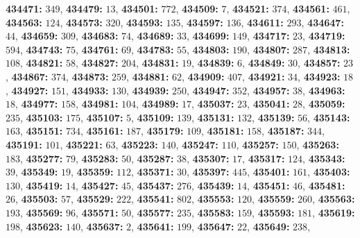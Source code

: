 \textsf{\bfseries 434471:} $349$, \textsf{\bfseries 434479:} $13$, \textsf{\bfseries 434501:} $772$, \textsf{\bfseries 434509:} $7$, \textsf{\bfseries 434521:} $374$, \textsf{\bfseries 434561:} $461$, \textsf{\bfseries 434563:} $124$, \textsf{\bfseries 434573:} $320$, \textsf{\bfseries 434593:} $135$, \textsf{\bfseries 434597:} $136$, \textsf{\bfseries 434611:} $293$, \textsf{\bfseries 434647:} $44$, \textsf{\bfseries 434659:} $309$, \textsf{\bfseries 434683:} $74$, \textsf{\bfseries 434689:} $33$, \textsf{\bfseries 434699:} $149$, \textsf{\bfseries 434717:} $23$, \textsf{\bfseries 434719:} $594$, \textsf{\bfseries 434743:} $75$, \textsf{\bfseries 434761:} $69$, \textsf{\bfseries 434783:} $55$, \textsf{\bfseries 434803:} $190$, \textsf{\bfseries 434807:} $287$, \textsf{\bfseries 434813:} $108$, \textsf{\bfseries 434821:} $58$, \textsf{\bfseries 434827:} $204$, \textsf{\bfseries 434831:} $19$, \textsf{\bfseries 434839:} $6$, \textsf{\bfseries 434849:} $30$, \textsf{\bfseries 434857:} $23$, \textsf{\bfseries 434867:} $374$, \textsf{\bfseries 434873:} $259$, \textsf{\bfseries 434881:} $62$, \textsf{\bfseries 434909:} $407$, \textsf{\bfseries 434921:} $34$, \textsf{\bfseries 434923:} $18$, \textsf{\bfseries 434927:} $151$, \textsf{\bfseries 434933:} $130$, \textsf{\bfseries 434939:} $250$, \textsf{\bfseries 434947:} $352$, \textsf{\bfseries 434957:} $38$, \textsf{\bfseries 434963:} $18$, \textsf{\bfseries 434977:} $158$, \textsf{\bfseries 434981:} $104$, \textsf{\bfseries 434989:} $17$, \textsf{\bfseries 435037:} $23$, \textsf{\bfseries 435041:} $28$, \textsf{\bfseries 435059:} $235$, \textsf{\bfseries 435103:} $175$, \textsf{\bfseries 435107:} $5$, \textsf{\bfseries 435109:} $139$, \textsf{\bfseries 435131:} $132$, \textsf{\bfseries 435139:} $56$, \textsf{\bfseries 435143:} $163$, \textsf{\bfseries 435151:} $734$, \textsf{\bfseries 435161:} $187$, \textsf{\bfseries 435179:} $109$, \textsf{\bfseries 435181:} $158$, \textsf{\bfseries 435187:} $344$, \textsf{\bfseries 435191:} $101$, \textsf{\bfseries 435221:} $63$, \textsf{\bfseries 435223:} $140$, \textsf{\bfseries 435247:} $110$, \textsf{\bfseries 435257:} $150$, \textsf{\bfseries 435263:} $183$, \textsf{\bfseries 435277:} $79$, \textsf{\bfseries 435283:} $50$, \textsf{\bfseries 435287:} $38$, \textsf{\bfseries 435307:} $17$, \textsf{\bfseries 435317:} $124$, \textsf{\bfseries 435343:} $39$, \textsf{\bfseries 435349:} $19$, \textsf{\bfseries 435359:} $112$, \textsf{\bfseries 435371:} $30$, \textsf{\bfseries 435397:} $445$, \textsf{\bfseries 435401:} $161$, \textsf{\bfseries 435403:} $130$, \textsf{\bfseries 435419:} $14$, \textsf{\bfseries 435427:} $45$, \textsf{\bfseries 435437:} $276$, \textsf{\bfseries 435439:} $14$, \textsf{\bfseries 435451:} $46$, \textsf{\bfseries 435481:} $26$, \textsf{\bfseries 435503:} $57$, \textsf{\bfseries 435529:} $222$, \textsf{\bfseries 435541:} $802$, \textsf{\bfseries 435553:} $120$, \textsf{\bfseries 435559:} $260$, \textsf{\bfseries 435563:} $193$, \textsf{\bfseries 435569:} $96$, \textsf{\bfseries 435571:} $50$, \textsf{\bfseries 435577:} $235$, \textsf{\bfseries 435583:} $159$, \textsf{\bfseries 435593:} $181$, \textsf{\bfseries 435619:} $198$, \textsf{\bfseries 435623:} $140$, \textsf{\bfseries 435637:} $2$, \textsf{\bfseries 435641:} $199$, \textsf{\bfseries 435647:} $22$, \textsf{\bfseries 435649:} $238$, 

